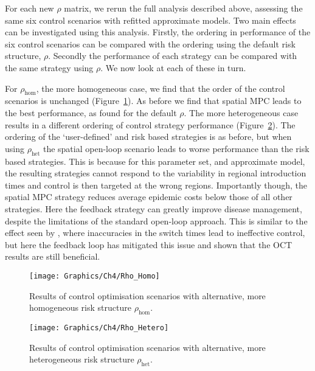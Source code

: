 For each new $\rho$ matrix, we rerun the full analysis described above, assessing the same six control scenarios with refitted approximate models. Two main effects can be investigated using this analysis. Firstly, the ordering in performance of the six control scenarios can be compared with the ordering using the default risk structure, $\rho$. Secondly the performance of each strategy can be compared with the same strategy using $\rho$. We now look at each of these in turn.

For $\rho_{\mathrm{hom}}$, the more homogeneous case, we find that the order of the control scenarios is unchanged (Figure~\ref{fig:ch4:rho_homo}). As before we find that spatial MPC leads to the best performance, as found for the default $\rho$. The more heterogeneous case results in a different ordering of control strategy performance (Figure~\ref{fig:ch4:rho_hetero}). The ordering of the `user-defined' and risk based strategies is as before, but when using $\rho_{\mathrm{het}}$ the spatial open-loop scenario leads to worse performance than the risk based strategies. This is because for this parameter set, and approximate model, the resulting strategies cannot respond to the variability in regional introduction times and control is then targeted at the wrong regions. Importantly though, the spatial MPC strategy reduces average epidemic costs below those of all other strategies. Here the feedback strategy can greatly improve disease management, despite the limitations of the standard open-loop approach. This is similar to the effect seen by \citet{forster_optimizing_2007}, where inaccuracies in the switch times lead to ineffective control, but here the feedback loop has mitigated this issue and shown that the OCT results are still beneficial.

\begin{figure}[h]
    \begin{center}
        \texttt{[image: Graphics/Ch4/Rho\_Homo]}
        \caption{Results of control optimisation scenarios with alternative, more homogeneous risk structure $\rho_{\mathrm{hom}}$.}
        \label{fig:ch4:rho_homo}
    \end{center}
\end{figure}

\begin{figure}[h]
    \begin{center}
        \texttt{[image: Graphics/Ch4/Rho\_Hetero]}
        \caption{Results of control optimisation scenarios with alternative, more heterogeneous risk structure $\rho_{\mathrm{het}}$.}
        \label{fig:ch4:rho_hetero}
    \end{center}
\end{figure}

